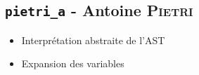 \subsection{\texttt{pietri\_a} - Antoine \textsc{Pietri}}

\begin{itemize}
    \item Interprétation abstraite de l'AST
    \item Expansion des variables
\end{itemize}
